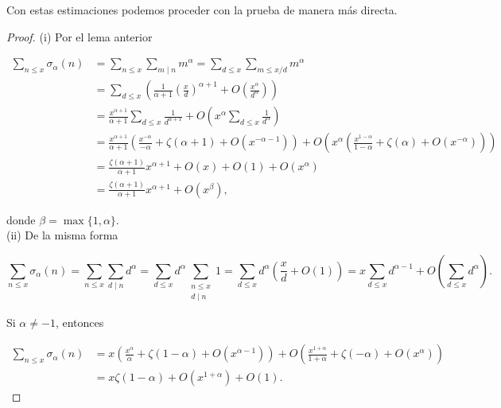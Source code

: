 \documentclass[12pt, a4paper]{article}
\begin{document}
Con estas estimaciones podemos proceder con la prueba de manera más directa.\\

\begin{proof}
	(i) Por el lema anterior

	\begin{align*}
		\sum_{n \le x} \sigma_\alpha(n)
		 & = \sum_{n \le x} \sum_{m \mid n} m^\alpha
		= \sum_{d \le x} \sum_{m \le x/d} m^\alpha                                \\
		 & = \sum_{d \le x} \left(
		                    \frac{1}{\alpha+1}\left(\frac{x}{d}\right)^{\alpha+1}
		+ O\!\left(\frac{x^\alpha}{d^\alpha}\right)
		\right)                                                                   \\
		 & = \frac{x^{\alpha+1}}{\alpha+1}
		\sum_{d \le x} \frac{1}{d^{\alpha+1}}
		+ O\!\left(x^\alpha \sum_{d \le x} \frac{1}{d^\alpha}\right)              \\
		 & = \frac{x^{\alpha+1}}{\alpha+1}
		\left(
		\frac{x^{-\alpha}}{-\alpha} + \zeta(\alpha+1) + O\left(x^{-\alpha-1}\right)
		\right) + O\left(
		x^\alpha \left(
		\frac{x^{1-\alpha}}{1-\alpha} + \zeta(\alpha) + O\left(x^{-\alpha}\right)
		\right)
		\right)                                                                   \\
		 & = \frac{\zeta(\alpha+1)}{\alpha+1} x^{\alpha+1}
		+ O(x) + O(1) + O(x^\alpha)                                               \\
		 & = \frac{\zeta(\alpha+1)}{\alpha+1} x^{\alpha+1}
		+ O(x^\beta),
	\end{align*}

	donde $\beta = \max\{1,\alpha\}.$\\

	(ii) De la misma forma

	\[
		\sum_{n \le x} \sigma_{\alpha}(n)
		= \sum_{n \le x} \sum_{d \mid n} d^{\alpha}
		= \sum_{d \le x} d^{\alpha} \sum_{\substack{n \le x \\ d \mid n}} 1
		= \sum_{d \le x} d^{\alpha} \left( \frac{x}{d} + O(1) \right)= x \sum_{d \le x} d^{\alpha-1} + O\!\left(\sum_{d \le x} d^{\alpha}\right).
	\]

	Si $\alpha \neq -1$, entonces

	\begin{align*}
		\sum_{n \le x} \sigma_{\alpha}(n) & =x\left(\frac{x^{\alpha}}{\alpha}+\zeta(1-\alpha)+O(x^{\alpha-1})\right)+O\left(\frac{x^{1+\alpha}}{1+\alpha}+\zeta(-\alpha)+O(x^\alpha)\right) \\
		                                  & =x\zeta(1-\alpha)+O(x^{1+\alpha})+O(1)
		.\end{align*}


\end{proof}
\end{document}
